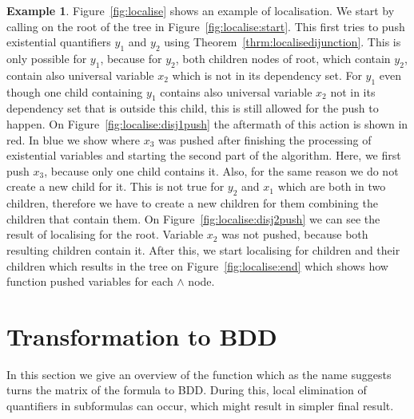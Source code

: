 \documentclass[
  digital, %
  color,
  twoside, %
  table,   %
  nolof,     %
  nolot,     %
]{fithesis3}
\theoremstyle{definition}
\newtheorem{example}{Example}
\theoremstyle{remark}
\begin{document}
\begin{example}
  \label{ex:QTlocalising}
  Figure~\ref{fig:localise} shows an example of localisation. We start by calling  on the root of the tree in Figure~\ref{fig:localise:start}. This first tries to push existential quantifiers $y_1$ and $y_2$ using Theorem~\ref{thrm:localisedijunction}. This is only possible for $y_1$, because for $y_2$, both children nodes of root, which contain $y_2$, contain also universal variable $x_2$ which is not in its dependency set. For $y_1$ even though one child containing $y_1$ contains also universal variable $x_2$ not in its dependency set that is outside this child, this is still allowed for the push to happen. On Figure~\ref{fig:localise:disj1push} the aftermath of this action is shown in red. In blue we show where $x_3$ was pushed after finishing the processing of existential variables and starting the second part of the algorithm. Here, we first push $x_3$, because only one child contains it. Also, for the same reason we do not create a new child for it. This is not true for $y_2$ and $x_1$ which are both in two children, therefore we have to create a new children for them combining the children that contain them. On Figure~\ref{fig:localise:disj2push} we can see the result of localising for the root. Variable $x_2$ was not pushed, because both resulting children contain it. After this, we start localising for children and their children which results in the tree on Figure~\ref{fig:localise:end} which shows how function  pushed variables for each ${\land}$ node.
\end{example}

\section{Transformation to BDD}
\label{sec:algturntobdd}
In this section we give an overview of the function  which as the name suggests turns the matrix of the formula to BDD. During this, local elimination of quantifiers in subformulas can occur, which might result in simpler final result. 
\end{document}
